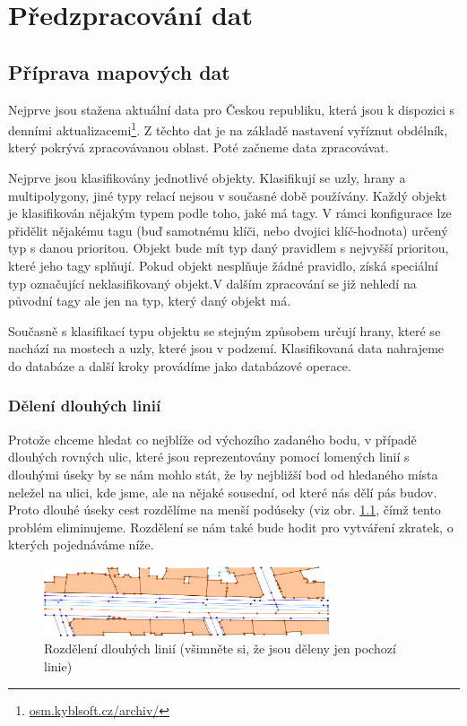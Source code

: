 \chapter{Předzpracování dat}


\section{Příprava mapových dat}
Nejprve jsou stažena aktuální data pro Českou republiku, která jsou k dispozici
s denními aktualizacemi\footnote{\url{osm.kyblsoft.cz/archiv/}}. Z těchto dat je
na základě nastavení vyříznut obdélník, který pokrývá zpracovávanou oblast. Poté
začneme data zpracovávat.

Nejprve jsou klasifikovány jednotlivé objekty. Klasifikují se uzly, hrany a
multipolygony, jiné typy relací nejsou v současné době používány. Každý objekt
je klasifikován nějakým typem podle toho, jaké má tagy. V rámci konfigurace lze
přidělit nějakému tagu (buď samotnému klíči, nebo dvojici klíč-hodnota) určený
typ s danou prioritou. Objekt bude mít typ daný pravidlem s nejvyšší prioritou,
které jeho tagy splňují. Pokud objekt nesplňuje žádné pravidlo, získá speciální
typ označující neklasifikovaný objekt.V dalším zpracování se již nehledí na
původní tagy ale jen na typ, který daný objekt má.

Současně s klasifikací typu objektu se stejným způsobem určují hrany, které se
nachází na mostech a uzly, které jsou v podzemí. Klasifikovaná data nahrajeme do
databáze a další kroky provádíme jako databázové operace. 

\subsection{Dělení dlouhých linií}
Protože chceme hledat co nejblíže od výchozího zadaného bodu, v případě dlouhých
rovných ulic, které jsou reprezentovány pomocí lomených linií s dlouhými úseky
by se nám mohlo stát, že by nejbližší bod od hledaného místa neležel na ulici,
kde jsme, ale na nějaké sousední, od které nás dělí pás budov. Proto dlouhé
úseky cest rozdělíme na menší podúseky (viz obr. \ref{fig:deleni}, čímž tento problém eliminujeme.
Rozdělení se nám také bude hodit pro vytváření zkratek, o kterých pojednáváme
níže.

\begin{figure}
  \centering
    \includegraphics[width=0.75\textwidth]{../img/deleni.pdf}
  \caption{Rozdělení dlouhých linií (všimněte si, že jsou děleny jen pochozí
  linie)}
  \label{fig:deleni}
\end{figure}

